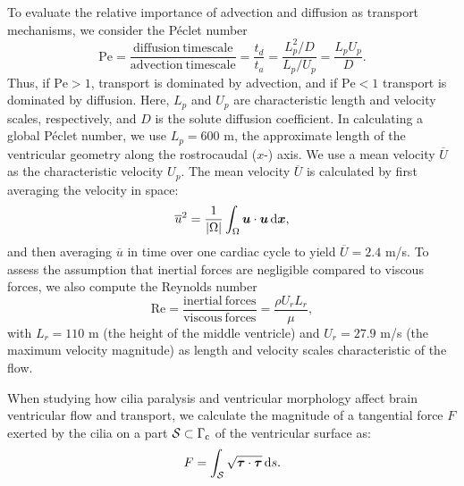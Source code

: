 \documentclass{WileyMSP-template}
\begin{document}
To evaluate the relative importance of advection and
diffusion as transport mechanisms, we consider the Péclet number
\begin{equation*}
    \mathrm{Pe} = \frac{\mathrm{diffusion \ timescale}}{\mathrm{advection \ timescale}}
    = \frac{t_d}{t_a} = \frac{L_p^2/D}{L_p/U_p} = \frac{L_p U_p}{D}.
\end{equation*}
Thus, if $\mathrm{Pe} > 1$, transport is dominated by advection,
and if $\mathrm{Pe} < 1$ transport is dominated by diffusion.
Here, $L_p$ and $U_p$ are characteristic length and velocity scales,
respectively, and $D$ is the solute diffusion coefficient.
In calculating a global Péclet number, we use $L_p=600$ \textmu m, the approximate length of the
ventricular geometry along the rostrocaudal ($x$-) axis.
We use a mean velocity $\overline{U}$ as the characteristic velocity $U_p$.
The mean velocity $\overline{U}$ is calculated by first averaging the velocity in space:
\begin{equation*}
    \overline{u}^2 = \frac{1}{|\Omega|}\int_{\Omega}\bm{u}\cdot\bm{u}\, \mathrm d\bm{x},
\end{equation*}
and then averaging $\overline{u}$ in time over one cardiac cycle to yield $\overline{U} = 2.4$ \textmu m/s.
To assess the assumption that inertial forces are negligible compared to
viscous forces, we also compute the Reynolds number
\begin{equation*}
    \mathrm{Re} = \frac{\mathrm{inertial \ forces}}{\mathrm{viscous \ forces}} = \frac{\rho U_r L_r}{\mu},
\end{equation*}
with $L_r = 110$ \textmu m (the height of the middle ventricle) and
$U_r = 27.9$ \textmu m/s (the maximum velocity magnitude)
as length and velocity scales characteristic of the flow.

When studying how cilia paralysis and ventricular morphology affect brain ventricular
flow and transport, we calculate the magnitude of a tangential force $F$ 
exerted by the cilia on a part $\mathcal{S}\subset\Gamma_{\mathrm{c}}$ of the ventricular surface as:
\begin{equation}
    F = \int_{\mathcal{S}}\sqrt{\bm{\tau}\cdot\bm{\tau}}\,\mathrm ds.
    \label{eq:tangential_force_calculation}
\end{equation}
\end{document}
